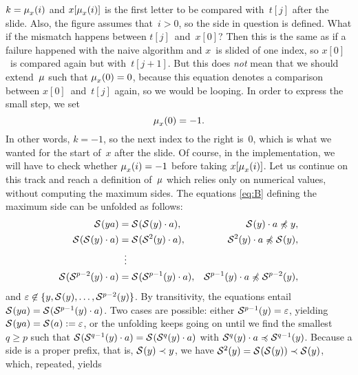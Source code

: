 \(k=\mu_{x}^{}(i)\) and \(x[\mu_{x}^{}(i)]\) is the first
letter to be compared with~\(t[j]\) after the slide. Also, the figure
assumes that~\({i>0}\), so the side in question is defined. What if
the mismatch happens between \(t[j]\)~and~\(x[0]\)?  Then this is the
same as if a failure happened with the naive algorithm and \(x\)~is
slided of one index, so \(x[0]\)~is compared again but
with~\(t[j+1]\). But this does \emph{not} mean that we should
extend~\(\mu\) such that \(\mu_{x}^{}(0) = 0\),
because this equation denotes a comparison between
\(x[0]\)~and~\(t[j]\) again, so we would be looping. In order to
express the small step, we set
\begin{equation}
\mu_{x}^{}(0) = -1.\label{eq:beta_0}
\end{equation}
In other words, \({k=-1}\), so the next index to the right is~\(0\),
which is what we wanted for the start of~\(x\) after the slide. Of
course, in the implementation, we will have to check whether
\(\mu_{x}^{}(i) = -1\) before taking
\(x[\mu_{x}^{}(i)]\). Let us continue on this track and reach a
definition of~\(\mu\) which relies only on numerical
values, without computing the maximum sides. The equations
\eqref{eq:B}  defining the maximum side can be unfolded
as follows:
\begin{align*}
   \mathcal{S}^{}(ya)
&= \mathcal{S}^{}(\mathcal{S}^{}(y) \cdot a),
& \mathcal{S}^{}(y) \cdot a \not\preccurlyeq y,\\
   \mathcal{S}^{}(\mathcal{S}^{}(y) \cdot a)
&= \mathcal{S}^{}(\mathcal{S}^{2}(y) \cdot a),
&  \mathcal{S}^{2}(y) \cdot a \not\preccurlyeq \mathcal{S}^{}(y),\\
&\;\;\vdots
& \\
   \mathcal{S}^{}(\mathcal{S}^{p-2}(y) \cdot a)
&= \mathcal{S}^{}(\mathcal{S}^{p-1}(y) \cdot a),
& \mathcal{S}^{p-1}(y) \cdot a \not\preccurlyeq \mathcal{S}^{p-2}(y),
\end{align*}
and \(\varepsilon \not\in \{y,\mathcal{S}^{}(y), \dots,
\mathcal{S}^{p-2}(y)\}\). By transitivity, the equations entail
\(\mathcal{S}^{}(ya) = \mathcal{S}^{}(\mathcal{S}^{p-1}(y) \cdot a)\). Two cases are
possible: either \(\mathcal{S}^{p-1}(y) = \varepsilon\), yielding
\(\mathcal{S}^{}(ya) = \mathcal{S}^{}(a) := \varepsilon\), or the
unfolding keeps going on until we find the smallest \({q \geqslant p}\)
such that \(\mathcal{S}^{}(\mathcal{S}^{q-1}(y) \cdot a) =
\mathcal{S}^{}(\mathcal{S}^{q}(y) \cdot a)\) with \(\mathcal{S}^{q}(y) \cdot a
\preccurlyeq \mathcal{S}^{q-1}(y)\). Because a side is a proper prefix,
that is, \(\mathcal{S}^{}(y) \prec y\), we have \(\mathcal{S}^{2}(y) =
\mathcal{S}^{}(\mathcal{S}^{}(y)) \prec \mathcal{S}^{}(y)\), which, repeated, yields
